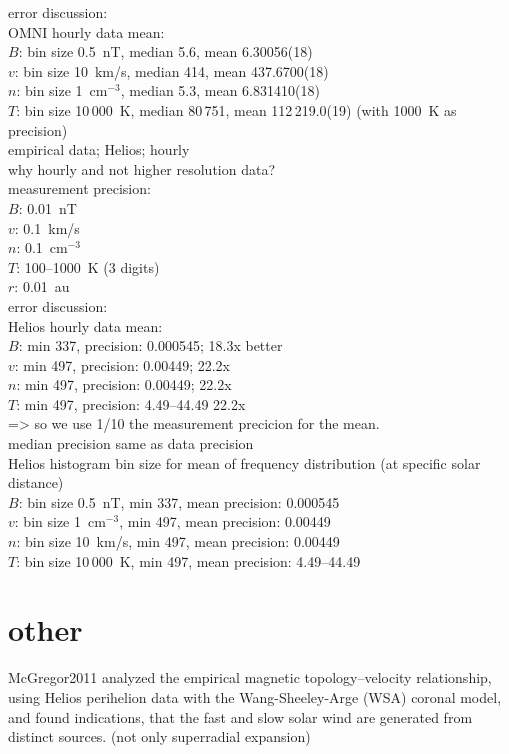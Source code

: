 error discussion:\\
OMNI hourly data mean:\\
$B$: bin size 0.5~nT, median 5.6, mean 6.30056(18)\\
$v$: bin size 10~km/s, median 414, mean 437.6700(18)\\
$n$: bin size 1~cm$^{-3}$, median 5.3, mean 6.831410(18)\\
$T$: bin size 10\,000~K, median 80\,751, mean 112\,219.0(19) (with 1000~K as precision)\\

empirical data; Helios; hourly\\
why hourly and not higher resolution data?\\
measurement precision:\\
$B$: 0.01~nT\\
$v$: 0.1~km/s\\
$n$: 0.1~cm$^{-3}$\\
$T$: 100--1000~K (3 digits)\\
$r$: 0.01~au\\

error discussion:\\
Helios hourly data mean:\\
$B$: min 337, precision: 0.000545; 18.3x better\\
$v$: min 497, precision: 0.00449; 22.2x\\
$n$: min 497, precision:  0.00449; 22.2x\\
$T$: min 497, precision: 4.49--44.49 22.2x\\
=> so we use 1/10 the measurement precicion for the mean.\\

median precision same as data precision\\

Helios histogram bin size for mean of frequency distribution (at specific solar distance)\\
$B$: bin size 0.5~nT, min 337, mean precision: 0.000545\\
$v$: bin size 1~cm$^{-3}$, min 497, mean precision: 0.00449\\
$n$: bin size 10~km/s, min 497, mean precision:  0.00449\\
$T$: bin size 10\,000~K, min 497, mean precision: 4.49--44.49\\

\section{other}
McGregor2011 analyzed the empirical magnetic topology–velocity relationship, using Helios perihelion data with the Wang-Sheeley-Arge (WSA) coronal model, and found indications, that the fast and slow solar wind are generated from distinct sources. (not only superradial expansion)\\


